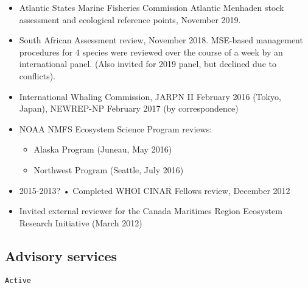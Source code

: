 \documentclass[11pt, a4paper]{awesome-cv}
\providecommand{\tightlist}{%
	\setlength{\itemsep}{0pt}\setlength{\parskip}{0pt}}
\begin{document}
\begin{itemize}
\item
  Atlantic States Marine Fisheries Commission Atlantic Menhaden stock
  assessment and ecological reference points, November 2019.
\item
  South African Assessment review, November 2018. MSE-based management
  procedures for 4 species were reviewed over the course of a week by an
  international panel. (Also invited for 2019 panel, but declined due to
  conflicts).
\item
  International Whaling Commission, JARPN II February 2016 (Tokyo,
  Japan), NEWREP-NP February 2017 (by correspondence)
\item
  NOAA NMFS Ecosystem Science Program reviews:

  \begin{itemize}
  \tightlist
  \item
    Alaska Program (Juneau, May 2016)
  \item
    Northwest Program (Seattle, July 2016)
  \end{itemize}
\item
  2015-2013? • Completed WHOI CINAR Fellows review, December 2012
\item
  Invited external reviewer for the Canada Maritimes Region Ecosystem
  Research Initiative (March 2012)
\end{itemize}

\hypertarget{advisory-services}{%
\subsection{Advisory services}\label{advisory-services}}

\begin{verbatim}
Active
\end{verbatim}
\end{document}
